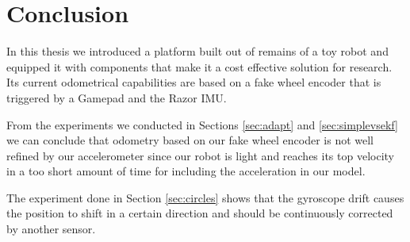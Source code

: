 \documentclass[class=article, crop=false]{standalone}
\begin{document}
\chapter{Conclusion}\label{cha:conclusion}

In this thesis we introduced a platform built out of remains of a toy robot and equipped it with components that make it a cost effective solution for research. Its current odometrical capabilities are based on a fake wheel encoder that is triggered by a Gamepad and the Razor IMU.

From the experiments we conducted in Sections \ref{sec:adapt} and \ref{sec:simplevsekf} we can conclude that odometry based on our fake wheel encoder is not well refined by our accelerometer since our robot is light and reaches its top velocity in a too short amount of time for including the acceleration in our model.

The experiment done in Section \ref{sec:circles} shows that the gyroscope drift causes the position to shift in a certain direction and should be continuously corrected by another sensor.
\end{document}

